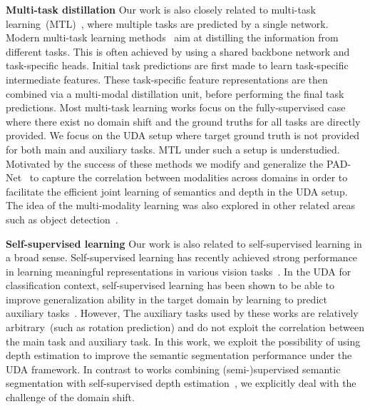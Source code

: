\documentclass[10pt,twocolumn,letterpaper]{article}
\begin{document}
\textbf{Multi-task distillation}
Our work is also closely related to multi-task learning~(MTL)~\cite{mtl:survey}, where multiple tasks are predicted by a single network. Modern multi-task learning methods~\cite{xu2018pad, zhang2019pattern, vandenhende2020mti} aim at distilling the information from different tasks. This is often achieved by using a shared backbone network and task-specific heads. Initial task predictions are first made to learn task-specific intermediate features. These task-specific feature representations are then combined via a multi-modal distillation unit, before performing the final task predictions. Most multi-task learning works focus on the fully-supervised case where there exist no domain shift and the ground truths for all tasks are directly provided. We focus on the UDA setup where target ground truth is not provided for both main and auxiliary tasks. MTL under such a setup is understudied. Motivated by the success of these methods we modify and generalize the PAD-Net~\cite{xu2018pad} to capture the correlation between modalities across domains in order to facilitate the efficient joint learning of semantics and depth in the UDA setup. The idea of the multi-modality learning was also explored in other related areas such as object detection~\cite{liang2018deep, kong2018recurrent, ouyang2020dynamic}.


\textbf{Self-supervised learning}
Our work is also related to self-supervised learning in a broad sense. Self-supervised learning has recently achieved strong performance in learning meaningful representations in various vision tasks~\cite{he2020momentum, chen2020simple}. In the UDA for classification context, self-supervised learning has been shown to be able to improve generalization ability in the target domain by learning to predict auxiliary tasks~\cite{xu2019self, saito2020universal, sun2019unsupervised}. However, The auxiliary tasks used by these works are relatively arbitrary~(such as rotation prediction) and do not exploit the correlation between the main task and auxiliary task. In this work, we exploit the possibility of using depth estimation to improve the semantic segmentation performance under the UDA framework. In contrast to works combining (semi-)supervised semantic segmentation with self-supervised depth estimation~\cite{jiang2018self, hoyer2020three}, we explicitly deal with the challenge of the domain shift.
\end{document}
